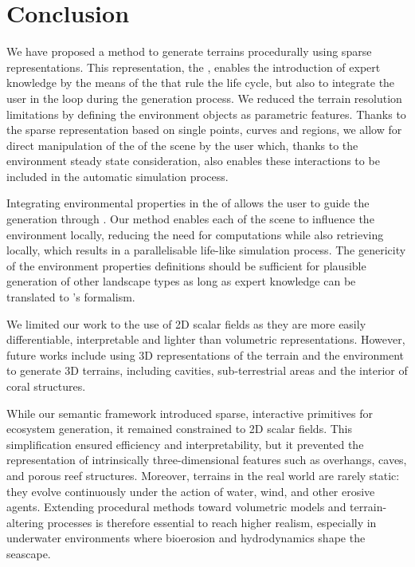 \section{Conclusion}
\label{sec:env-obj-conclusion}
We have proposed a method to generate terrains procedurally using sparse representations. This representation, the , enables the introduction of expert knowledge by the means of the  that rule the  life cycle, but also to integrate the user in the loop during the generation process. We reduced the terrain resolution limitations by defining the environment objects as parametric features. Thanks to the sparse representation based on single points, curves and regions, we allow for direct manipulation of the  of the scene by the user which, thanks to the environment steady state consideration, also enables these interactions to be included in the automatic simulation process.

Integrating environmental properties in the  of  allows the user to guide the generation through . Our method enables each  of the scene to influence the environment locally, reducing the need for computations while also retrieving  locally, which results in a parallelisable life-like simulation process. The genericity of the environment properties definitions should be sufficient for plausible generation of other landscape types as long as expert knowledge can be translated to 's formalism.

We limited our work to the use of 2D scalar fields as they are more easily differentiable, interpretable and lighter than volumetric representations. However, future works include using 3D representations of the terrain and the environment to generate 3D terrains, including cavities, sub-terrestrial areas and the interior of coral structures.

While our semantic  framework introduced sparse, interactive primitives for ecosystem generation, it remained constrained to 2D scalar fields. This simplification ensured efficiency and interpretability, but it prevented the representation of intrinsically three-dimensional features such as overhangs, caves, and porous reef structures. Moreover, terrains in the real world are rarely static: they evolve continuously under the action of water, wind, and other erosive agents. Extending procedural methods toward volumetric models and terrain-altering processes is therefore essential to reach higher realism, especially in underwater environments where bioerosion and hydrodynamics shape the seascape.

